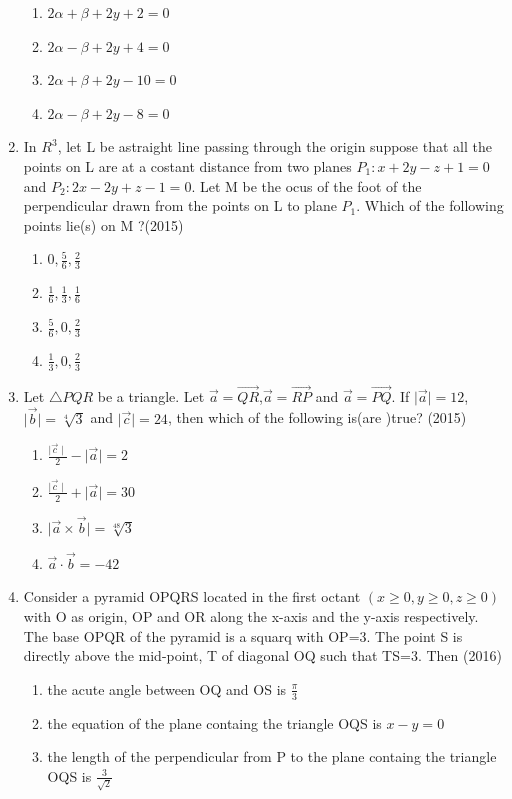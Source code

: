 \documentclass[12pt]{article}
\begin{document}
\begin{enumerate}
\begin{enumerate}
\item $2\alpha+\beta+2y+2=0$
\item $2\alpha-\beta+2y+4=0$
\item $2\alpha+\beta+2y-10=0$
\item $2\alpha-\beta+2y-8=0$
\end{enumerate}
\item In $R^3$, let L be astraight line passing through the origin suppose that all the points on L are at a costant distance from two planes $P_1:x+2y-z+1=0$ and $P_2:2x-2y+z-1=0$. Let M be the ocus of the foot of the perpendicular drawn from the points on L to plane $P_1$. Which of the following points lie(s) on M ?(2015)
\begin{enumerate}
\item $0,\frac{5}{6},\frac{2}{3}$
\item $\frac{1}{6},\frac{1}{3},\frac{1}{6}$
\item $\frac{5}{6},0,\frac{2}{3}$
\item $\frac{1}{3},0,\frac{2}{3}$
\end{enumerate}
\item Let $\triangle PQR$ be a triangle. Let $\vec{a}=\overrightarrow{QR}$,$\vec{a}=\overrightarrow{RP}$ and $\vec{a}=\overrightarrow{PQ}$. If $\mid \vec{a} \mid=12$,$\mid \vec{b} \mid=\sqrt[4]{3}$ and $\mid \vec{c} \mid=24$, then which of the following is(are )true? (2015)
\begin{enumerate}
\item $\frac{\mid \vec{c} \mid}{2}-\mid \vec{a} \mid=2$
\item $\frac{\mid \vec{c} \mid}{2}+\mid \vec{a} \mid=30$
\item $\mid \vec{a}\times \vec{b} \mid=\sqrt[48]{3}$
\item $\vec{a}\cdot\vec{b}=-42$
\end{enumerate}
\item Consider a pyramid OPQRS located in the first octant $(x\geq 0,y\geq 0,z\geq 0)$ with O as origin, OP and OR along the x-axis and the y-axis respectively. The base OPQR of the pyramid is a squarq with OP=3. The point S is directly above the mid-point, T of diagonal OQ such that TS=3. Then (2016)
\begin{enumerate}
\item the acute angle between OQ and OS is $\frac{\pi}{3}$
\item the equation of the plane containg the triangle OQS is $x-y=0$
\item the length of the perpendicular from P to the plane containg the triangle OQS is $\frac{3}{\sqrt{2}}$

\end{enumerate}
\end{enumerate}
\end{document}
